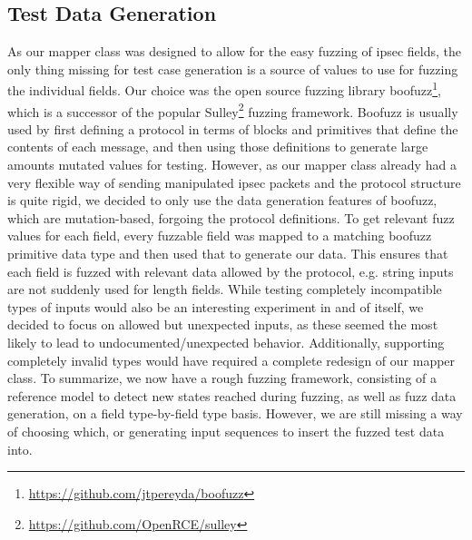 \subsection{Test Data Generation} \label{subsec:data_gen}
As our mapper class was designed to allow for the easy fuzzing of \ac{ipsec} fields, the only thing missing for test case generation is a source of values to use for fuzzing the individual fields. Our choice was the open source fuzzing library boofuzz\footnote{\url{https://github.com/jtpereyda/boofuzz}}, which is a successor of the popular Sulley\footnote{\url{https://github.com/OpenRCE/sulley}} fuzzing framework. Boofuzz is usually used by first defining a protocol in terms of blocks and primitives that define the contents of each message, and then using those definitions to generate large amounts mutated values for testing. However, as our mapper class already had a very flexible way of sending manipulated \ac{ipsec} packets and the protocol structure is quite rigid, we decided to only use the data generation features of boofuzz, which are mutation-based, forgoing the protocol definitions. To get relevant fuzz values for each field, every fuzzable field was mapped to a matching boofuzz primitive data type and then used that to generate our data. This ensures that each field is fuzzed with relevant data allowed by the protocol, e.g. string inputs are not suddenly used for length fields. While testing completely incompatible types of inputs would also be an interesting experiment in and of itself, we decided to focus on allowed but unexpected inputs, as these seemed the most likely to lead to undocumented/unexpected behavior. Additionally, supporting completely invalid types would have required a complete redesign of our mapper class. To summarize, we now have a rough fuzzing framework, consisting of a reference model to detect new states reached during fuzzing, as well as fuzz data generation, on a field type-by-field type basis. However, we are still missing a way of choosing which, or generating input sequences to insert the fuzzed test data into. 


